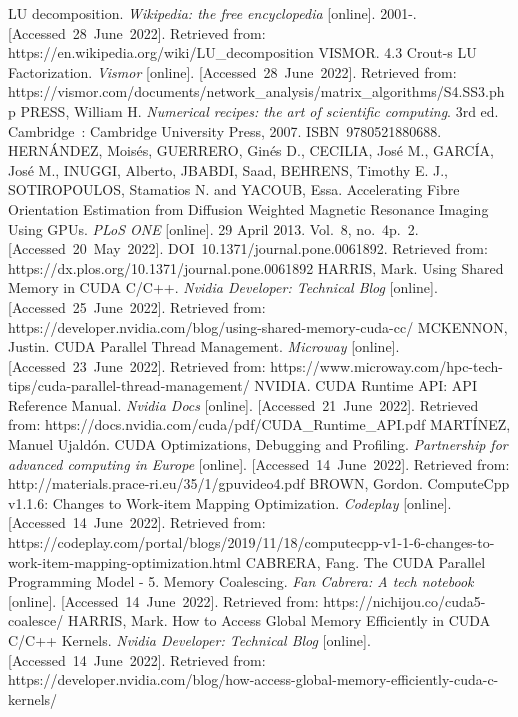 \begin{thebibliography}{45}
	LU decomposition. \textit{Wikipedia: the free encyclopedia} [online]. 2001-. [Accessed 28 June 2022]. Retrieved from: https://en.wikipedia.org/wiki/LU\_decomposition
	VISMOR. 4.3 Crout-s LU Factorization. \textit{Vismor} [online]. [Accessed 28 June 2022]. Retrieved from: https://vismor.com/documents/network\_analysis/matrix\_algorithms/S4.SS3.php
	PRESS, William H. \textit{Numerical recipes: the art of scientific computing}. 3rd ed. Cambridge : Cambridge University Press, 2007. ISBN 9780521880688.
	HERNÁNDEZ, Moisés, GUERRERO, Ginés D., CECILIA, José M., GARCÍA, José M., INUGGI, Alberto, JBABDI, Saad, BEHRENS, Timothy E. J., SOTIROPOULOS, Stamatios N. and YACOUB, Essa. Accelerating Fibre Orientation Estimation from Diffusion Weighted Magnetic Resonance Imaging Using GPUs. \textit{PLoS ONE} [online]. 29 April 2013. Vol. 8, no. 4p. 2. [Accessed 20 May 2022]. DOI 10.1371/journal.pone.0061892. Retrieved from: https://dx.plos.org/10.1371/journal.pone.0061892
	HARRIS, Mark. Using Shared Memory in CUDA C/C++. \textit{Nvidia Developer: Technical Blog} [online]. [Accessed 25 June 2022]. Retrieved from: https://developer.nvidia.com/blog/using-shared-memory-cuda-cc/
	MCKENNON, Justin. CUDA Parallel Thread Management. \textit{Microway} [online]. [Accessed 23 June 2022]. Retrieved from: https://www.microway.com/hpc-tech-tips/cuda-parallel-thread-management/
	NVIDIA. CUDA Runtime API: API Reference Manual. \textit{Nvidia Docs} [online]. [Accessed 21 June 2022]. Retrieved from: https://docs.nvidia.com/cuda/pdf/CUDA\_Runtime\_API.pdf
	MARTÍNEZ, Manuel Ujaldón. CUDA Optimizations, Debugging and Profiling. \textit{Partnership for advanced computing in Europe} [online]. [Accessed 14 June 2022]. Retrieved from: http://materials.prace-ri.eu/35/1/gpuvideo4.pdf
	BROWN, Gordon. ComputeCpp v1.1.6: Changes to Work-item Mapping Optimization. \textit{Codeplay} [online]. [Accessed 14 June 2022]. Retrieved from: https://codeplay.com/portal/blogs/2019/11/18/computecpp-v1-1-6-changes-to-work-item-mapping-optimization.html
	CABRERA, Fang. The CUDA Parallel Programming Model - 5. Memory Coalescing. \textit{Fan Cabrera: A tech notebook} [online]. [Accessed 14 June 2022]. Retrieved from: https://nichijou.co/cuda5-coalesce/
	HARRIS, Mark. How to Access Global Memory Efficiently in CUDA C/C++ Kernels. \textit{Nvidia Developer: Technical Blog} [online]. [Accessed 14 June 2022]. Retrieved from: https://developer.nvidia.com/blog/how-access-global-memory-efficiently-cuda-c-kernels/

\end{thebibliography}

